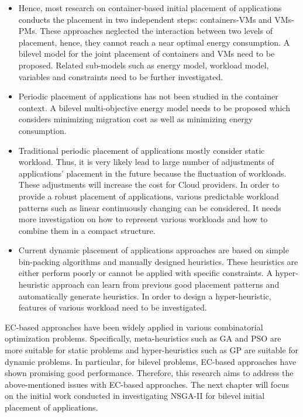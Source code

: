 \begin{itemize}
	\item {} Hence, most research on container-based initial placement of applications conducts the placement in two independent steps: containers-VMs and VMs-PMs. These approaches neglected the interaction between two levels of placement, hence, they cannot reach a near optimal energy consumption. A bilevel model for the joint placement of containers and VMs need to be proposed. Related sub-models such as energy model, workload model, variables and constraints need to be further investigated.
	\item Periodic placement of applications has not been studied in the container context. A bilevel multi-objective energy model needs to be proposed which considers minimizing migration cost as well as minimizing energy consumption. 
	\item Traditional periodic placement of applications mostly consider static workload. Thus, it is very likely lead to large number of adjustments of applications' placement in the future because the fluctuation of workloads. These adjustments will increase the cost for Cloud providers. In order to provide a robust placement of applications, various predictable workload patterns such as linear continuously changing can be considered. It needs more investigation on how to represent various workloads and how to combine them in a compact structure.
	\item Current dynamic placement of applications approaches are based on simple bin-packing algorithms and manually designed heuristics. These heuristics are either perform poorly or cannot be applied with specific constraints. A hyper-heuristic approach can learn from previous good placement patterns and automatically generate heuristics. In order to design a hyper-heuristic, features of various workload need to be investigated. 
\end{itemize}

EC-based approaches have been widely applied in various combinatorial optimization problems. Specifically, meta-heuristics such as GA and PSO are more suitable for static problems and hyper-heuristics such as GP are suitable for dynamic problems. In particular, for bilevel problems, EC-based approaches have shown promising good performance. Therefore, this research aims to address the above-mentioned issues with EC-based approaches. The next chapter will focus on the initial work conducted in investigating NSGA-II for bilevel initial placement of applications.

